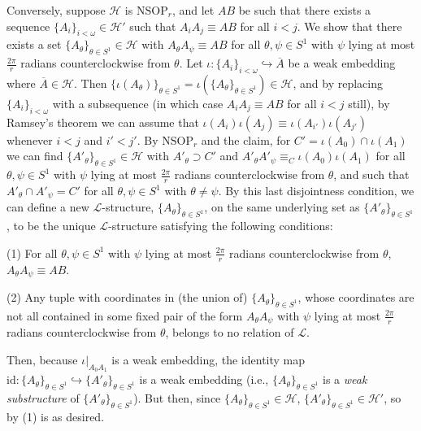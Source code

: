 \documentclass{amsart}
\theoremstyle{definition}
\theoremstyle{remark}
\numberwithin{equation}{section}
\begin{document}
Conversely, suppose $\mathcal{H}$ is $\mathrm{NSOP}_{r}$, and let $AB$ be such that there exists a sequence $\{ A_{i}\}_{i < \omega} \in \mathcal{H}'$ such that $A_{i}A_{j} \equiv AB$ for all $i < j$. We show that there exists a set $\{ A_{\theta}\}_{\theta \in S^{1}} \in \mathcal{H}$ with $A_{\theta}A_{\psi} \equiv AB$ for all $\theta, \psi \in S^{1}$ with $\psi$ lying at most $\frac{2\pi}{r}$ radians counterclockwise from $\theta$. Let $\iota: \{ A_{i}\}_{i < \omega} \hookrightarrow \overline{A}$ be a weak embedding where $\overline{A} \in \mathcal{H}$. Then $ \{ \iota(A_{\theta})\}_{\theta \in S^{1}}=\iota(\{ A_{\theta}\}_{\theta \in S^{1}}) \in \mathcal{H}$, and by replacing $\{ A_{i}\}_{i < \omega}$ with a subsequence (in which case $A_{i}A_{j} \equiv AB$ for all $i < j$ still), by Ramsey's theorem we can assume that $\iota(A_{i})\iota(A_{j}) \equiv \iota(A_{i'})\iota(A_{j'})$ whenever $i < j$ and $i' < j'$. By $\mathrm{NSOP}_{r}$ and the claim, for $C' = \iota(A_{0}) \cap \iota(A_{1})$ we can find $\{ A'_{\theta}\}_{\theta \in S^{1}} \in \mathcal{H}$ with $A'_{\theta} \supset C'$ and $A'_{\theta}A'_{\psi} \equiv_{C} \iota(A_{0})\iota(A_{1})$ for all $\theta, \psi \in S^{1}$ with $\psi$ lying at most $\frac{2\pi}{r}$ radians counterclockwise from $\theta$, and such that $A'_{\theta} \cap A'_{\psi} = C'$ for all $\theta, \psi \in S^{1}$ with $\theta \neq \psi$. By this last disjointness condition, we can define a new $\mathcal{L}$-structure, $\{ A_{\theta}\}_{\theta \in S^{1}}$, on the same underlying set as $\{ A'_{\theta}\}_{\theta \in S^{1}}$, to be the unique $\mathcal{L}$-structure satisfying the following conditions:

(1) For all $\theta, \psi \in S^{1}$ with $\psi$ lying at most $\frac{2\pi}{r}$ radians counterclockwise from $\theta$, $A_{\theta}A_{\psi} \equiv AB$.

(2) Any tuple with coordinates in (the union of) $\{ A_{\theta}\}_{\theta \in S^{1}}$, whose coordinates are not all contained in some fixed pair of the form $A_{\theta}A_{\psi}$ with $\psi$ lying at most $\frac{2\pi}{r}$ radians counterclockwise from $\theta$, belongs to no relation of $\mathcal{L}$.

Then, because $\iota|_{A_{0}A_{1}}$ is a weak embedding, the identity map $\mathrm{id}: \{ A_{\theta}\}_{\theta \in S^{1}} \hookrightarrow \{ A'_{\theta}\}_{\theta \in S^{1}}$ is a weak embedding (i.e.,  $\{ A_{\theta}\}_{\theta \in S^{1}}$ is a \textit{weak substructure} of $\{ A'_{\theta}\}_{\theta \in S^{1}}$). But then, since $\{ A_{\theta}\}_{\theta \in S^{1}} \in \mathcal{H}$, $\{ A'_{\theta}\}_{\theta \in S^{1}} \in \mathcal{H}'$, so by (1) is as desired.
\end{document}
